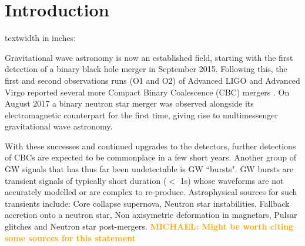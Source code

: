 \documentclass[12pt]{iopart}
\newcommand{\michael}[1]{\textbf{\textcolor{orange}{MICHAEL: #1}}}
\begin{document}
\section{Introduction}
textwidth in inches: \prntlen{\textwidth}

%
Gravitational wave astronomy is now an established field, starting with the first
detection of a binary black hole merger \cite{Abbott2016} in September 2015.
Following this, the first and second observations runs (O1 and O2) of Advanced
LIGO and Advanced Virgo \cite{Prospects-dets, AdvLIGO, AdvLIGO2, AdvVIRGO} reported several more Compact Binary Coalescence (CBC)
mergers \cite{Abbott2016a, Abbott2017, Abbott2017a, Abbott2017b}. On August
2017 a binary neutron star merger was observed alongside its electromagnetic
counterpart for the first time, giving rise to multimessenger gravitational
wave astronomy. 

%
With these successes and continued upgrades to the detectors, further detections of CBCs are expected to be commonplace in a few short years. Another group of GW signals that has thus far been undetectable is GW ``bursts".  GW bursts are transient signals of typically short duration ($<$ 1s) whose
waveforms are not accurately modelled or are complex to re-produce.
Astrophysical sources for such transients include: Core collapse supernova,
Neutron star instabilities, Fallback accretion onto a neutron star, Non
axisymetric deformation in magnetars, Pulsar glitches and Neutron star
post-mergers. \michael{Might be worth citing some sources for this statement}
\end{document}

